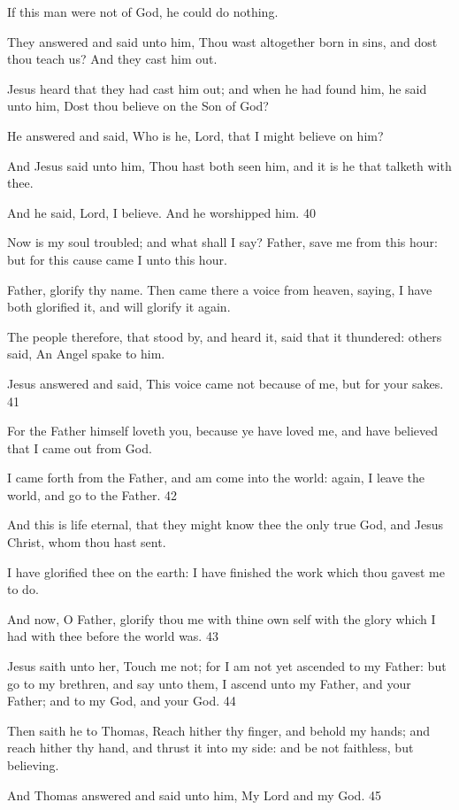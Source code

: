 If this man were not of God, he could do nothing.

They answered and said unto him, Thou wast altogether born in sins, and dost thou teach us?
And they cast him out.

Jesus heard that they had cast him out; and when he had found him, he said unto him, Dost
thou believe on the Son of God?

He answered and said, Who is he, Lord, that I might believe on him?

And Jesus said unto him, Thou hast both seen him, and it is he that talketh with thee.

And he said, Lord, I believe. And he worshipped him. 40

Now is my soul troubled; and what shall I say? Father, save me from this hour: but for this
cause came I unto this hour.

Father, glorify thy name. Then came there a voice from heaven, saying, I have both glorified
it, and will glorify it again.

The people therefore, that stood by, and heard it, said that it thundered: others said, An Angel
spake to him.

Jesus answered and said, This voice came not because of me, but for your sakes. 41

For the Father himself loveth you, because ye have loved me, and have believed that I came
out from God.

I came forth from the Father, and am come into the world: again, I leave the world, and go to
the Father. 42

And this is life eternal, that they might know thee the only true God, and Jesus Christ, whom
thou hast sent.

I have glorified thee on the earth: I have finished the work which thou gavest me to do.

And now, O Father, glorify thou me with thine own self with the glory which I had with thee
before the world was. 43

Jesus saith unto her, Touch me not; for I am not yet ascended to my Father: but go to my
brethren, and say unto them, I ascend unto my Father, and your Father; and to my God, and
your God. 44

Then saith he to Thomas, Reach hither thy finger, and behold my hands; and reach hither thy
hand, and thrust it into my side: and be not faithless, but believing.

And Thomas answered and said unto him, My Lord and my God. 45

